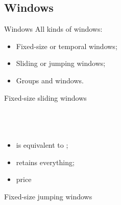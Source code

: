 \documentclass[brown, compress, mathserif]{beamer}
\begin{document}
\subsection{Windows}

\begin{frame}{Windows}
  All kinds of windows:
  \begin{itemize}
  \item Fixed-size or temporal windows;
  \item Sliding or jumping windows;
  \item Groups and windows.
  \end{itemize}
\end{frame}


\begin{frame}{Fixed-size sliding windows}
  \hlstd{}\hspace*{\fill}\\
  \hlstd{}\hlstd{}\hlsym{(}\hlsym{) }\hlstd{}\\
  \\
  \hlsym{= }\hlstd{}\hlstd{}\hspace*{\fill}\\
  \mbox{}
  \begin{itemize}
  \item {}   is equivalent to ;
  \item {} retains everything;
  \item {}   price
  \end{itemize}
\end{frame}


\begin{frame}{Fixed-size jumping windows}
  \hlstd{}\hspace*{\fill}\\
  \hlstd{}\hspace*{\fill}\\
  \hlstd{}\hlstd{}\hlsym{(}\hlsym{) }\hlstd{}\\
  \\
  \hlsym{= }\hlstd{}\hlstd{}\hspace*{\fill}\\
\end{frame}
\end{document}
